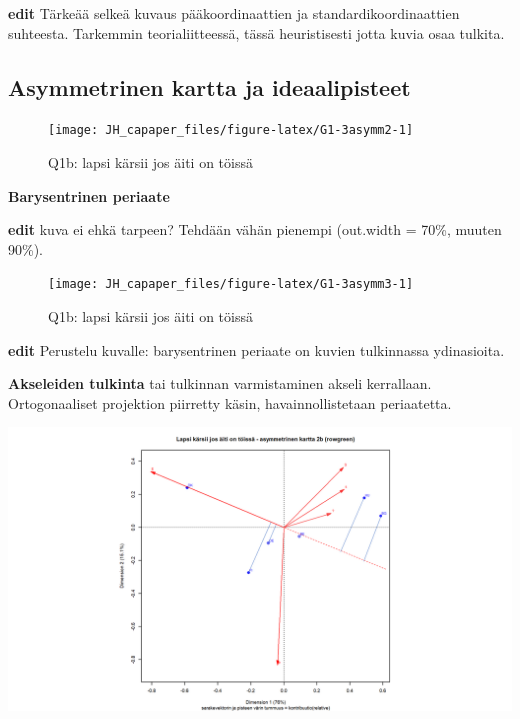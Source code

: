 \documentclass[
  finnish,
]{book}
\begin{document}
\textbf{edit} Tärkeää selkeä kuvaus pääkoordinaattien ja
standardikoordinaattien suhteesta. Tarkemmin teorialiitteessä, tässä
heuristisesti jotta kuvia osaa tulkita.

\hypertarget{asymmetrinen-kartta-ja-ideaalipisteet}{%
\subsection{Asymmetrinen kartta ja
ideaalipisteet}\label{asymmetrinen-kartta-ja-ideaalipisteet}}

\begin{figure}

{\centering \texttt{[image: JH\_capaper\_files/figure-latex/G1-3asymm2-1]} 

}

\caption{Q1b: lapsi kärsii jos äiti on töissä}\label{fig:G1-3asymm2}
\end{figure}

\textbf{Barysentrinen periaate}

\textbf{edit} kuva ei ehkä tarpeen? Tehdään vähän pienempi (out.width =
70\%, muuten 90\%).

\begin{figure}

{\centering \texttt{[image: JH\_capaper\_files/figure-latex/G1-3asymm3-1]} 

}

\caption{Q1b: lapsi kärsii jos äiti on töissä}\label{fig:G1-3asymm3}
\end{figure}

\textbf{edit} Perustelu kuvalle: barysentrinen periaate on kuvien
tulkinnassa ydinasioita.

\textbf{Akseleiden tulkinta} tai tulkinnan varmistaminen akseli
kerrallaan. Ortogonaaliset projektion piirretty käsin,
havainnollistetaan periaatetta.

\begin{center}\includegraphics[width=0.9\linewidth]{img/simpleCAasymmTulk2} \end{center}
\end{document}
